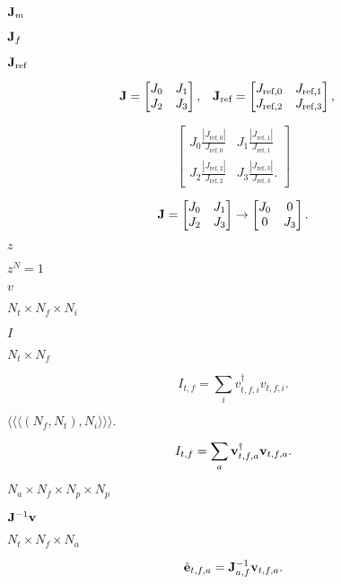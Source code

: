 \documentclass{article}
\begin{document}
${\bf J}_m$
\pagebreak

${\bf J}_f$
\pagebreak

${\bf J}_\text{ref}$
\pagebreak

\[ \begin{aligned} {\bf J} &= \begin{bmatrix} J_0 & J_1 \\ J_2 & J_3 \end{bmatrix}, & {\bf J}_\text{ref} &= \begin{bmatrix} J_{\text{ref},0} & J_{\text{ref},1} \\ J_{\text{ref},2} & J_{\text{ref},3} \end{bmatrix}, \end{aligned} \]
\pagebreak

\[ \begin{bmatrix} J_0\frac{|J_{\text{ref},0}|}{J_{\text{ref},0}} & J_1\frac{|J_{\text{ref},1}|}{J_{\text{ref},1}} \\ J_2\frac{|J_{\text{ref},2}|}{J_{\text{ref},2}} & J_3\frac{|J_{\text{ref},3}|}{J_{\text{ref},3}}. \end{bmatrix} \]
\pagebreak

\[ {\bf J} = \begin{bmatrix} J_0 & J_1 \\ J_2 & J_3 \end{bmatrix} \rightarrow \begin{bmatrix} J_0 & 0 \\ 0 & J_3 \end{bmatrix}. \]
\pagebreak

$z$
\pagebreak

$z^N = 1$
\pagebreak

$v$
\pagebreak

$N_t \times N_f \times N_i$
\pagebreak

$I$
\pagebreak

$N_t \times N_f$
\pagebreak

\[ I_{t,f} = \sum_i v_{t,f,i}^\dagger v_{t,f,i}. \]
\pagebreak

$\langle\langle\langle(N_f, N_t), N_i\rangle\rangle\rangle.$
\pagebreak

\[ I_{t,f} = \sum_a {\bf v}_{t,f,a}^\dagger {\bf v}_{t,f,a}. \]
\pagebreak

$N_a \times N_f \times N_p \times N_p$
\pagebreak

${\bf J}^{-1}{\bf v}$
\pagebreak

$N_t \times N_f \times N_a$
\pagebreak

\[ \tilde{\bf e}_{t,f,a} = {\bf J}^{-1}_{a,f}{\bf v}_{t,f,a}. \]
\pagebreak
\end{document}
